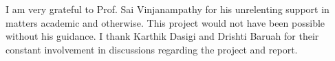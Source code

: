 
I am very grateful to Prof. Sai Vinjanampathy for his unrelenting support in
matters academic and otherwise. This project would not have been possible
without his guidance. I thank Karthik Dasigi and Drishti Baruah for their
constant involvement in discussions regarding the project and report.